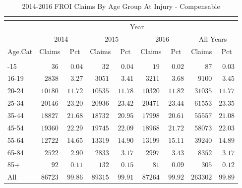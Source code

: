 \documentclass[9pt, oneside]{article}   	%
\begin{document}
\begin{longtable}{lcccccccc}
\caption{2014-2016 FROI Claims By Age Group At Injury - Compensable}\\ 
\label{Table: Five}\\
\hline
                  \toprule
 & \multicolumn{8}{c}{Year} \\ 
 & \multicolumn{2}{c}{2014} & \multicolumn{2}{c}{2015} & \multicolumn{2}{c}{2016} & \multicolumn{2}{c}{All Years} \\ 
Age.Cat  & Claims & Pct & Claims & Pct & Claims & Pct & Claims & \multicolumn{1}{c}{Pct} \\ 
\midrule\\ [-1\normalbaselineskip]\hline\endhead\hline\endfoot
14-15  & $\phantom{000}36$ & $\phantom{0}0.04$ & $\phantom{000}32$ & $\phantom{0}0.04$ & $\phantom{000}19$ & $\phantom{0}0.02$ & $\phantom{0000}87$ & $\phantom{0}0.03$ \\
16-19  & $\phantom{0}2838$ & $\phantom{0}3.27$ & $\phantom{0}3051$ & $\phantom{0}3.41$ & $\phantom{0}3211$ & $\phantom{0}3.68$ & $\phantom{00}9100$ & $\phantom{0}3.45$ \\
20-24  & $10180$ & $11.72$ & $10535$ & $11.78$ & $10320$ & $11.82$ & $\phantom{0}31035$ & $11.77$ \\
25-34  & $20146$ & $23.20$ & $20936$ & $23.42$ & $20471$ & $23.44$ & $\phantom{0}61553$ & $23.35$ \\
35-44  & $18827$ & $21.68$ & $18732$ & $20.95$ & $17998$ & $20.61$ & $\phantom{0}55557$ & $21.08$ \\
45-54  & $19360$ & $22.29$ & $19745$ & $22.09$ & $18968$ & $21.72$ & $\phantom{0}58073$ & $22.03$ \\
55-64  & $12722$ & $14.65$ & $13319$ & $14.90$ & $13199$ & $15.11$ & $\phantom{0}39240$ & $14.89$ \\
65-84  & $\phantom{0}2522$ & $\phantom{0}2.90$ & $\phantom{0}2833$ & $\phantom{0}3.17$ & $\phantom{0}2997$ & $\phantom{0}3.43$ & $\phantom{00}8352$ & $\phantom{0}3.17$ \\
85+  & $\phantom{000}92$ & $\phantom{0}0.11$ & $\phantom{00}132$ & $\phantom{0}0.15$ & $\phantom{000}81$ & $\phantom{0}0.09$ & $\phantom{000}305$ & $\phantom{0}0.12$ \\
\cline{1-1} \cline{2-2} \cline{3-3} \cline{4-4} \cline{5-5} \cline{6-6} \cline{7-7}  \cline{8-8} \cline{9-9}%
All  & $86723$ & $99.86$ & $89315$ & $99.91$ & $87264$ & $99.92$ & $263302$ & $99.89$ \\
\hline 
\end{longtable}
\end{document}
